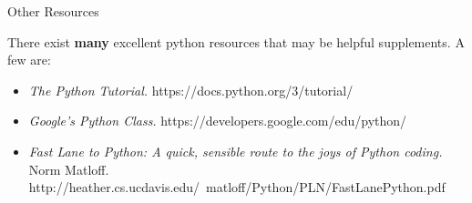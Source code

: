\documentclass[serif,xcolor=pdftex,dvipsnames,table,hyperref={bookmarks=false,breaklinks}]{beamer}
\begin{document}
\begin{frame}[t]{Other Resources}
	
	There exist \textbf{many} excellent python resources that may be helpful supplements. A few are:
	
\pause
\begin{itemize}[<+->]
\item \textit{The Python Tutorial.} https://docs.python.org/3/tutorial/
\item \textit{Google's Python Class.} https://developers.google.com/edu/python/
\item \textit{Fast Lane to Python: A quick, sensible route to the joys of Python coding.} Norm Matloff. http://heather.cs.ucdavis.edu/~matloff/Python/PLN/FastLanePython.pdf
\end{itemize}

\end{frame}

%
%
%
%
%
%
%
%
%
%
\end{document}
